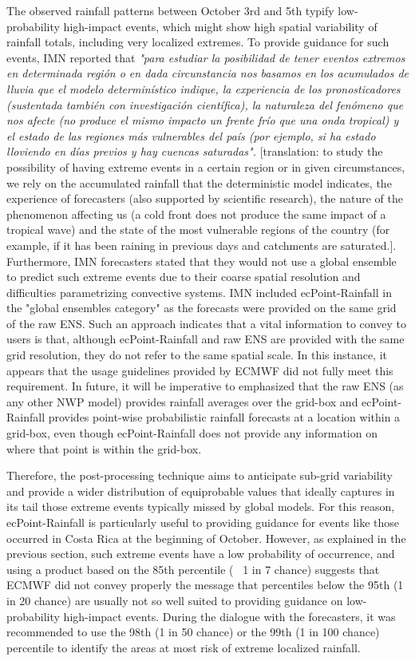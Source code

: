 \documentclass[twocol]{ametsocV5} %
\begin{document}
The observed rainfall patterns between October 3rd and 5th typify low-probability high-impact events, which might show high spatial variability of rainfall totals, including very localized extremes. To provide guidance for such events, IMN reported that \textit{"para estudiar la posibilidad de tener eventos extremos en determinada región o en dada circunstancia nos basamos en los acumulados de lluvia que  el modelo determinístico indique, la experiencia de los pronosticadores (sustentada también con investigación científica), la naturaleza del fenómeno que nos afecte (no produce el mismo impacto un frente frío que una onda tropical) y el estado de las regiones más vulnerables del país (por ejemplo, si ha estado lloviendo en días previos y hay cuencas saturadas".} [translation: to study the possibility of having extreme events in a certain region or in given circumstances, we rely on the accumulated rainfall that the deterministic model indicates, the experience of forecasters (also supported by scientific research), the nature of the phenomenon affecting us (a cold front does not produce the same impact of a tropical wave) and the state of the most vulnerable regions of the country (for example, if it has been raining in previous days and catchments are saturated.]. Furthermore, IMN forecasters stated that they would not use a global ensemble to predict such extreme events due to their coarse spatial resolution and difficulties parametrizing convective systems. IMN included ecPoint-Rainfall in the "global ensembles category" as the forecasts were provided on the same grid of the raw ENS. Such an approach indicates that a vital information to convey to users is that, although ecPoint-Rainfall and raw ENS are provided with the same grid resolution, they do not refer to the same spatial scale. In this instance, it appears that the usage guidelines provided by ECMWF did not fully meet this requirement. In future, it will be imperative to emphasized that the raw ENS (as any other NWP model) provides rainfall averages over the grid-box and ecPoint-Rainfall provides point-wise probabilistic rainfall forecasts at a location within a grid-box, even though ecPoint-Rainfall does not provide any information on where that point is within the grid-box. \par
Therefore, the post-processing technique aims to anticipate sub-grid variability and provide a wider distribution of equiprobable values that ideally captures in its tail those extreme events typically missed by global models. For this reason, ecPoint-Rainfall is particularly useful to providing guidance for events like those occurred in Costa Rica at the beginning of October. However, as explained in the previous section, such extreme events have a low probability of occurrence, and using a product based on the 85th percentile (~ 1 in 7 chance) suggests that ECMWF did not convey properly the message that percentiles below the 95th (1 in 20 chance) are usually not so well suited to providing guidance on low-probability high-impact events. During the dialogue with the forecasters, it was recommended to use the 98th (1 in 50 chance) or the 99th (1 in 100 chance) percentile to identify the areas at most risk of extreme localized rainfall. \par
\end{document}

